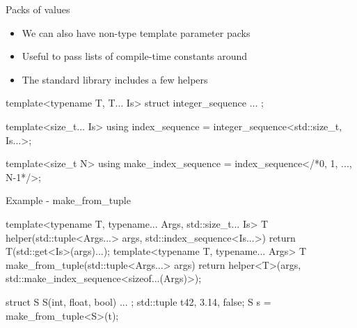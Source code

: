 \begin{frame}[fragile]
  \begin{block}{Packs of values}
    \begin{itemize}
      \item We can also have non-type template parameter packs
      \item Useful to pass lists of compile-time constants around
      \item The standard library includes a few helpers
    \end{itemize}
  \end{block}
  \begin{block}{}
    \begin{cppcode*}{}
      template<typename T, T... Is>
      struct integer_sequence { ... };

      template<size_t... Is>
      using index_sequence =
        integer_sequence<std::size_t, Is...>;

      template<size_t N>
      using make_index_sequence =
        index_sequence</*0, 1, ..., N-1*/>;
    \end{cppcode*}
  \end{block}
\end{frame}

\begin{frame}[fragile]
  \begin{exampleblock}{Example - make\_from\_tuple}
    \begin{cppcode*}{}
      template<typename T,
        typename... Args, std::size_t... Is>
      T helper(std::tuple<Args...> args,
        std::index_sequence<Is...>) {
        return T(std::get<Is>(args)...);
      }
      template<typename T, typename... Args>
      T make_from_tuple(std::tuple<Args...> args) {
         return helper<T>(args,
           std::make_index_sequence<sizeof...(Args)>{});
      }

      struct S { S(int, float, bool) { ... } };
      std::tuple t{42, 3.14, false};
      S s = make_from_tuple<S>(t);
    \end{cppcode*}
  \end{exampleblock}
\end{frame}
